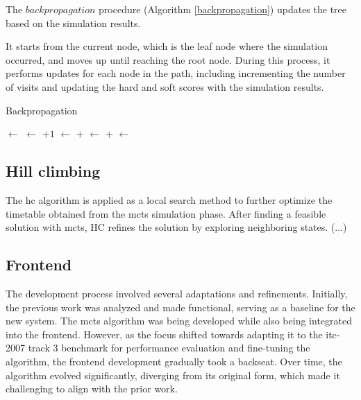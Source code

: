 The \(backpropagation\) procedure (Algorithm \ref{backpropagation}) updates the tree based on the simulation results. 

It starts from the current node, which is the leaf node where the simulation occurred, and moves up until reaching the root node. During this process, it performs updates for each node in the path, including incrementing the number of visits and updating the hard and soft scores with the simulation results. 

\begin{algorithm}
\caption{Backpropagation}\label{backpropagation}
\begin{algorithmic}[1]
    \State {} $\gets$ 
        \State {} $\gets$  $+ 1$
        \State {} $\gets$  $+$ 
        \State {} $\gets$  $+$ 
        \State {} $\gets$ 
    \EndWhile
\EndProcedure
\end{algorithmic}
\end{algorithm}

\subsection{Hill climbing}\label{hill_climbing_section}

The \ac{hc} algorithm is applied as a local search method to further optimize the timetable obtained from the \ac{mcts} simulation phase. After finding a feasible solution with \ac{mcts}, \ac{HC} refines the solution by exploring neighboring states. 
(...)

\subsection{Frontend}

The development process involved several adaptations and refinements. Initially, the previous work was analyzed and made functional, serving as a baseline for the new system. The \ac{mcts} algorithm was being developed while also being integrated into the frontend. However, as the focus shifted towards adapting it to the \ac{itc-2007} track 3 benchmark for performance evaluation and fine-tuning the algorithm, the frontend development gradually took a backseat. Over time, the algorithm evolved significantly, diverging from its original form, which made it challenging to align with the prior work.

